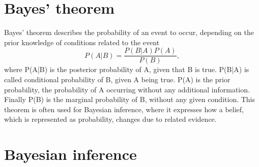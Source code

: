 \section{Bayes' theorem}

Bayes' theorem describes the probability of an event to occur, depending on the prior knowledge of conditions related to the event \citep{bayesBasic}
\begin{equation}
\label{eqn:bayesianTheorem}
P(A|B) = \frac{P(B|A)P(A)}{P(B)},
\end{equation}
where P(A|B) is the posterior probability of A, given that B is true. P(B|A) is called conditional probability of B, given A being true. P(A) is the prior probability, the probability of A occurring without any additional information. Finally P(B) is the marginal probability of B, without any given condition. This theorem is often used for Bayesian inference, where it expresses how a belief, which is represented as probability, changes due to related evidence.	

\section{Bayesian inference}
\label{section:bayesianInference}

